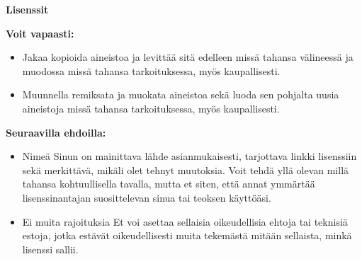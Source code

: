 
\pagestyle{empty}

{\large\textbf{Lisenssit}}



\textbf{Voit vapaasti:}
\begin{itemize}
\item Jakaa {\textemdash} kopioida aineistoa ja levittää sitä edelleen missä tahansa välineessä ja muodossa missä tahansa tarkoituksessa, myös kaupallisesti.
\item Muunnella {\textemdash} remiksata ja muokata aineistoa sekä luoda sen pohjalta uusia aineistoja missä tahansa tarkoituksessa, myös kaupallisesti.
\end{itemize}

\textbf{Seuraavilla ehdoilla:}
\begin{itemize}
\item Nimeä {\textemdash} Sinun on mainittava lähde asianmukaisesti, tarjottava linkki lisenssiin sekä merkittävä, mikäli olet tehnyt muutoksia. Voit tehdä yllä olevan millä tahansa kohtuullisella tavalla, mutta et siten, että annat ymmärtää lisenssinantajan suosittelevan sinua tai teoksen käyttöäsi.
\item Ei muita rajoituksia {\textemdash} Et voi asettaa sellaisia oikeudellisia ehtoja tai teknisiä estoja, jotka estävät oikeudellisesti muita tekemästä mitään sellaista, minkä lisenssi sallii.
\end{itemize}

\restoregeometry
\clearpage
